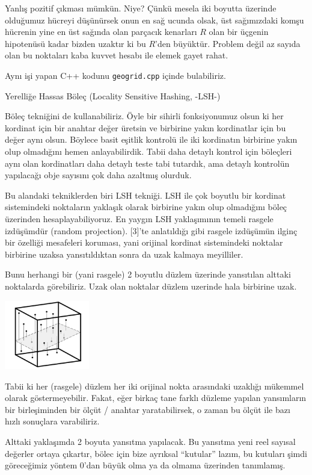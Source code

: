 \documentclass[12pt,fleqn]{article}\usepackage{../../common}
\begin{document}
Yanlış pozitif çıkması mümkün. Niye? Çünkü mesela iki boyutta üzerinde olduğumuz
hücreyi düşünürsek onun en sağ ucunda olsak, üst sağımızdaki komşu hücrenin yine
en üst sağında olan parçacık kenarları $R$ olan bir üçgenin hipotenüsü kadar
bizden uzaktır ki bu $R$'den büyüktür. Problem değil az sayıda olan bu noktaları
kaba kuvvet hesabı ile elemek gayet rahat.

Aynı işi yapan C++ kodunu \verb!geogrid.cpp! içinde bulabiliriz.

Yerelliğe Hassas Böleç (Locality Sensitive Hashing, -LSH-)

Böleç tekniğini de kullanabiliriz. Öyle bir sihirli fonksiyonumuz olsun ki her
kordinat için bir anahtar değer üretsin ve birbirine yakın kordinatlar için bu
değer aynı olsun. Böylece basit eşitlik kontrolü ile iki kordinatın birbirine
yakın olup olmadığını hemen anlayabilirdik. Tabii daha detaylı kontrol için
böleçleri aynı olan kordinatları daha detaylı teste tabi tutardık, ama detaylı
kontrolün yapılacağı obje sayısını çok daha azaltmış olurduk.

Bu alandaki tekniklerden biri LSH tekniği. LSH ile çok boyutlu bir kordinat
sistemindeki noktaların yaklaşık olarak birbirine yakın olup olmadığını böleç
üzerinden hesaplayabiliyoruz. En yaygın LSH yaklaşımının temeli rasgele
izdüşümdür (random projection). [3]'te anlatıldığı gibi rasgele izdüşümün ilginç
bir özelliği mesafeleri koruması, yani orijinal kordinat sistemindeki noktalar
birbirine uzaksa yansıtıldıktan sonra da uzak kalmaya meyilliler.

Bunu herhangi bir (yani rasgele) 2 boyutlu düzlem üzerinde yansıtılan alttaki
noktalarda görebiliriz. Uzak olan noktalar düzlem uzerinde hala birbirine uzak.

\includegraphics[width=10em]{algs_073_hash_01.png}

Tabii ki her (rasgele) düzlem her iki orijinal nokta arasındaki uzaklığı
mükemmel olarak göstermeyebilir. Fakat, eğer birkaç tane farklı düzleme yapılan
yansımların bir birleşiminden bir ölçüt / anahtar yaratabilirsek, o zaman bu
ölçüt ile bazı hızlı sonuçlara varabiliriz.

Alttaki yaklaşımda 2 boyuta yansıtma yapılacak. Bu yansıtma yeni reel sayısal
değerler ortaya çıkartır, bölec için bize ayrıksal ``kutular'' lazım, bu
kutuları şimdi göreceğimiz yöntem 0'dan büyük olma ya da olmama üzerinden
tanımlamış.
\end{document}
